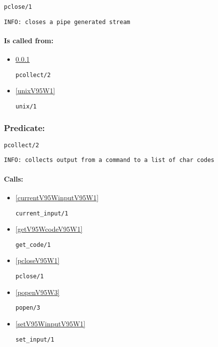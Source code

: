 \begin{verbatim}
pclose/1
\end{verbatim}

{\small \begin{verbatim}
INFO: closes a pipe generated stream

\end{verbatim}}
\paragraph{Is called from:} 
\begin{itemize}
\item \ref{pcollectV95W2} 
\begin{verbatim}
pcollect/2
\end{verbatim}

\item \ref{unixV95W1} 
\begin{verbatim}
unix/1
\end{verbatim}

\end{itemize}

\subsubsection{Predicate:} \label{pcollectV95W2}

\begin{verbatim}
pcollect/2
\end{verbatim}

{\small \begin{verbatim}
INFO: collects output from a command to a list of char codes

\end{verbatim}}
\paragraph{Calls:} 
\begin{itemize}
\item \ref{currentV95WinputV95W1} 
\begin{verbatim}
current_input/1
\end{verbatim}

\item \ref{getV95WcodeV95W1} 
\begin{verbatim}
get_code/1
\end{verbatim}

\item \ref{pcloseV95W1} 
\begin{verbatim}
pclose/1
\end{verbatim}

\item \ref{popenV95W3} 
\begin{verbatim}
popen/3
\end{verbatim}

\item \ref{setV95WinputV95W1} 
\begin{verbatim}
set_input/1
\end{verbatim}

\end{itemize}
